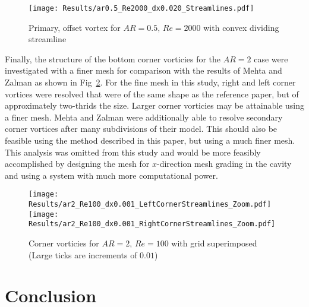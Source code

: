 \documentclass[twocolumn,10pt]{asme2ej}
\begin{document}
\begin{figure}[htb]
\begin{center}
\texttt{[image: Results/ar0.5\_Re2000\_dx0.020\_Streamlines.pdf]}
\caption{Primary, offset vortex for $AR=0.5,\,Re=2000$ with convex dividing streamline}
\label{AR0.5Re2000}
\end{center}
\end{figure}

Finally, the structure of the bottom corner vorticies for the $AR=2$ case were investigated with a finer mesh for comparison with the results of Mehta and Zalman as shown in Fig~\ref{Corners}.  For the fine mesh in this study, right and left corner vortices were resolved that were of the same shape as the reference paper, but of approximately two-thrids the size.  Larger corner vorticies may be attainable using a finer mesh.  Mehta and Zalman were additionally able to resolve secondary corner vortices after many subdivisions of their model.  This should also be feasible using the method described in this paper, but using a much finer mesh.  This analysis was omitted from this study and would be more feasibly accomplished by designing the mesh for $x$-direction mesh grading in the cavity and using a system with much more computational power.




\begin{figure}[htb]
\begin{center}
\texttt{[image: Results/ar2\_Re100\_dx0.001\_LeftCornerStreamlines\_Zoom.pdf]}
\texttt{[image: Results/ar2\_Re100\_dx0.001\_RightCornerStreamlines\_Zoom.pdf]}
\caption{Corner vorticies for $AR=2,\,Re=100$ with grid superimposed (Large ticks are increments of $0.01$)}
\label{Corners}
\end{center}
\end{figure}









\section{Conclusion}
\end{document}
